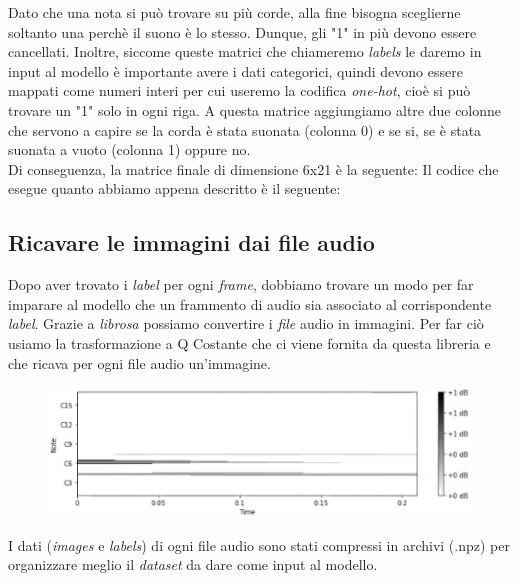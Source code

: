 Dato che una nota si può trovare su più corde, alla fine bisogna sceglierne soltanto una perchè il suono è lo stesso. Dunque, gli "1" in più devono essere cancellati. Inoltre, siccome queste matrici che chiameremo \textit{labels} le daremo in input al modello è importante avere i dati categorici, quindi devono essere mappati come numeri interi per cui useremo la codifica \textit{one-hot}, cioè si può trovare un "1" solo in ogni riga. A questa matrice aggiungiamo altre due colonne che servono a capire se la corda è stata suonata (colonna 0) e se si, se è stata suonata a vuoto (colonna 1) oppure no.\\
\newline
Di conseguenza, la matrice finale di dimensione 6x21 è la seguente:
\vspace*{2ex}
\vspace*{2ex}
Il codice che esegue quanto abbiamo appena descritto è il seguente:
\vspace*{2ex}
\subsection{Ricavare le immagini dai file audio}
Dopo aver trovato i \textit{label} per ogni \textit{frame}, dobbiamo trovare un modo per far imparare al modello che un frammento di audio sia associato al corrispondente \textit{label}.
Grazie a \textit{librosa} possiamo convertire i \textit{file} audio in immagini. Per far ciò usiamo la trasformazione a Q Costante che ci viene fornita da questa libreria e che ricava per ogni file audio un'immagine.
\begin{figure}[H]
	\centering
	\includegraphics[scale=0.90]{./images/img7.png}
\end{figure}
\vspace*{2ex}
\vspace*{2ex}
I dati (\textit{images} e \textit{labels}) di ogni file audio sono stati compressi in archivi (.npz) per organizzare meglio il \textit{dataset} da dare come input al modello.
